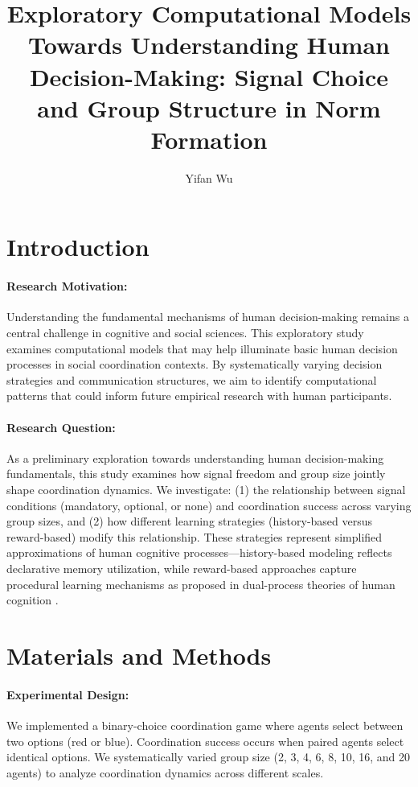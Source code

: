 \documentclass[12pt,a4paper]{article}
\title{Exploratory Computational Models Towards Understanding Human Decision-Making: Signal Choice and Group Structure in Norm Formation}
\author{Yifan Wu}
\date{}
\begin{document}
\maketitle

\section{Introduction}
\paragraph{Research Motivation:} Understanding the fundamental mechanisms of human decision-making remains a central challenge in cognitive and social sciences. This exploratory study examines computational models that may help illuminate basic human decision processes in social coordination contexts. By systematically varying decision strategies and communication structures, we aim to identify computational patterns that could inform future empirical research with human participants.

\paragraph{Research Question:} As a preliminary exploration towards understanding human decision-making fundamentals, this study examines how signal freedom and group size jointly shape coordination dynamics. We investigate: (1) the relationship between signal conditions (mandatory, optional, or none) and coordination success across varying group sizes, and (2) how different learning strategies (history-based versus reward-based) modify this relationship. These strategies represent simplified approximations of human cognitive processes—history-based modeling reflects declarative memory utilization, while reward-based approaches capture procedural learning mechanisms as proposed in dual-process theories of human cognition \citep{Daw2005}.

\section{Materials and Methods}
\paragraph{Experimental Design:} We implemented a binary-choice coordination game where agents select between two options (red or blue). Coordination success occurs when paired agents select identical options. We systematically varied group size (2, 3, 4, 6, 8, 10, 16, and 20 agents) to analyze coordination dynamics across different scales.
\end{document}
